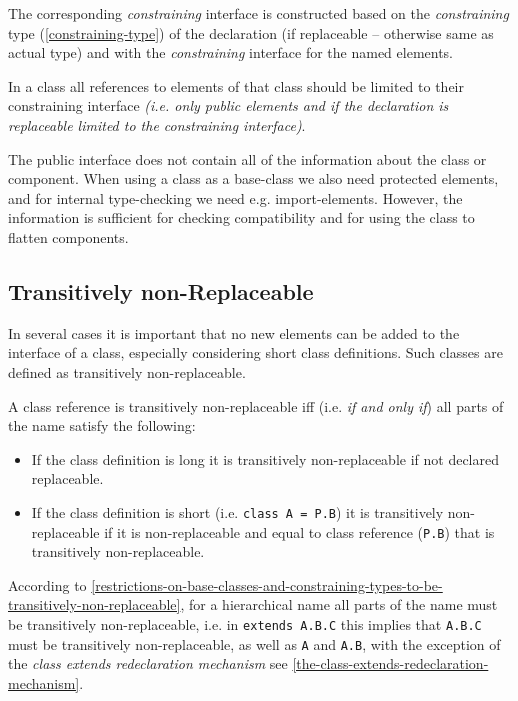 The corresponding \emph{constraining} interface is constructed based on
the \emph{constraining} type (\autoref{constraining-type}) of the declaration (if
replaceable -- otherwise same as actual type) and with the
\emph{constraining} interface for the named elements.

In a class all references to elements of that class should be limited to
their constraining interface \emph{(i.e. only public elements and if the
declaration is replaceable limited to the constraining interface)}.

\begin{nonnormative}
The public interface does not contain all of the information
about the class or component. When using a class as a base-class we also
need protected elements, and for internal type-checking we need e.g.
import-elements. However, the information is sufficient for checking
compatibility and for using the class to flatten components.
\end{nonnormative}

\subsection{Transitively non-Replaceable}

\begin{nonnormative}
In several cases it is important that no new elements can be
added to the interface of a class, especially considering short class
definitions. Such classes are defined as transitively
non-replaceable.
\end{nonnormative}

A class reference is transitively non-replaceable iff (i.e. \emph{if and
only if}) all parts of the name satisfy the following:

\begin{itemize}
\item
  If the class definition is long it is transitively non-replaceable if
  not declared replaceable.
\item
  If the class definition is short (i.e. \lstinline!class A = P.B!) it is
  transitively non-replaceable if it is non-replaceable and equal to
  class reference (\lstinline!P.B!) that is transitively non-replaceable.
\end{itemize}

\begin{nonnormative}
According to \autoref{restrictions-on-base-classes-and-constraining-types-to-be-transitively-non-replaceable}, for a hierarchical name all
parts of the name must be transitively non-replaceable, i.e. in \lstinline!extends A.B.C! this implies that \lstinline!A.B.C! must be transitively
non-replaceable, as well as \lstinline!A! and \lstinline!A.B!, with the exception of the \emph{class
extends redeclaration mechanism} see \autoref{the-class-extends-redeclaration-mechanism}.
\end{nonnormative}

